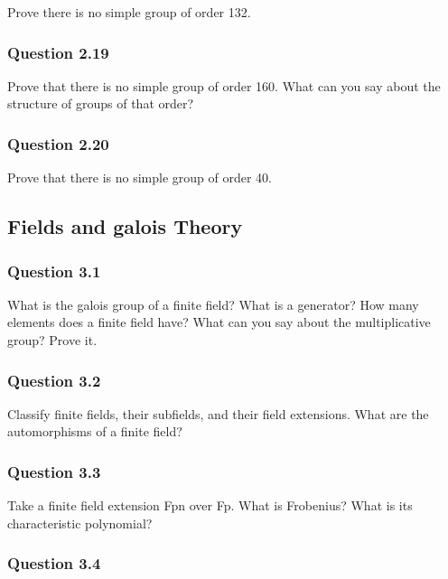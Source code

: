 Prove there is no simple group of order 132.

\hypertarget{question-2.19}{%
\subsubsection{Question 2.19}\label{question-2.19}}

Prove that there is no simple group of order 160. What can you say about
the structure of groups of that order?

\hypertarget{question-2.20}{%
\subsubsection{Question 2.20}\label{question-2.20}}

Prove that there is no simple group of order 40.

\hypertarget{fields-and-galois-theory}{%
\subsection{Fields and galois Theory}\label{fields-and-galois-theory}}

\hypertarget{question-3.1}{%
\subsubsection{Question 3.1}\label{question-3.1}}

What is the galois group of a finite field? What is a generator? How
many elements does a finite field have? What can you say about the
multiplicative group? Prove it.

\hypertarget{question-3.2}{%
\subsubsection{Question 3.2}\label{question-3.2}}

Classify finite fields, their subfields, and their field extensions.
What are the automorphisms of a finite field?

\hypertarget{question-3.3}{%
\subsubsection{Question 3.3}\label{question-3.3}}

Take a finite field extension Fpn over Fp. What is Frobenius? What is
its characteristic polynomial?

\hypertarget{question-3.4}{%
\subsubsection{Question 3.4}\label{question-3.4}}

